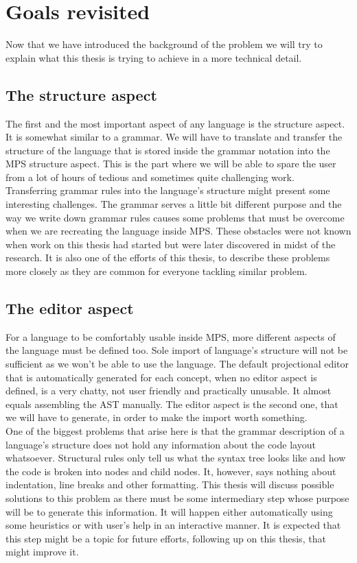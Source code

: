 \chapter{Goals revisited}

Now that we have introduced the background of the problem we will try to explain what this thesis is trying to achieve in a more technical detail.

\section{The structure aspect}
The first and the most important aspect of any language is the structure aspect. It is somewhat similar to a grammar. We will have to translate and transfer the structure of the language that is stored inside the grammar notation into the MPS structure aspect. This is the part where we will be able to spare the user from a lot of hours of tedious and sometimes quite challenging work.
\\

Transferring grammar rules into the language's structure might present some interesting challenges. The grammar serves a little bit different purpose and the way we write down grammar rules causes some problems that must be overcome when we are recreating the language inside MPS. These obstacles were not known when work on this thesis had started but were later discovered in midst of the research. It is also one of the efforts of this thesis, to describe these problems more closely as they are common for everyone tackling similar problem.

\section{The editor aspect}
For a language to be comfortably usable inside MPS, more different aspects of the language must be defined too. Sole import of language's structure will not be sufficient as we won't be able to use the language. The default projectional editor that is automatically generated for each concept, when no editor aspect is defined, is a very chatty, not user friendly and practically unusable. It almost equals assembling the AST manually. The editor aspect is the second one, that we will have to generate, in order to make the import worth something.
\\

One of the biggest problems that arise here is that the grammar description of a language's structure does not hold any information about the code layout whatsoever. Structural rules only tell us what the syntax tree looks like and how the code is broken into nodes and child nodes. It, however, says nothing about indentation, line breaks and other formatting. This thesis will discuss possible solutions to this problem as there must be some intermediary step whose purpose will be to generate this information. It will happen either automatically using some heuristics or with user's help in an interactive manner. It is expected that this step might be a topic for future efforts, following up on this thesis, that might improve it.

